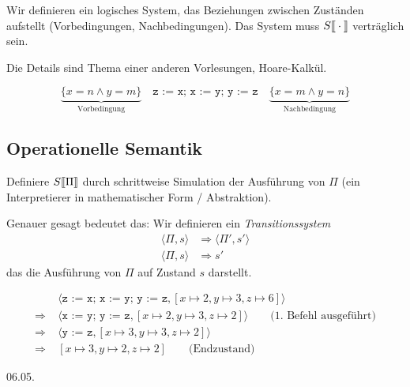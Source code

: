Wir definieren ein logisches System, das Beziehungen zwischen Zuständen aufstellt (Vorbedingungen, Nachbedingungen). Das System muss $S\mathrm{[}\kern-.14em\mathrm{[}\cdot\mathrm{]}\kern-.14em\mathrm{]}$ verträglich sein.

Die Details sind Thema einer anderen Vorlesungen, \zb{} Hoare-Kalkül.

\begin{example}
    \[
    \underbrace{\{ x = n \wedge y = m \}}_{\text{Vorbedingung}} \quad \texttt{z := x; x := y; y := z} \quad \underbrace{\{ x = m \wedge y = n \}}_{\text{Nachbedingung}}
    \]
\end{example}



\subsection{Operationelle Semantik}

Definiere $S\mathrm{[}\kern-.14em\mathrm{[}\Pi\mathrm{]}\kern-.14em\mathrm{]}$ durch schrittweise Simulation der Ausführung von $\Pi$ (ein Interpretierer in mathematischer Form / Abstraktion).

Genauer gesagt bedeutet das: Wir definieren ein \emph{Transitionssystem}
\begin{align*}
    \langle \Pi, s \rangle & \Rightarrow \langle \Pi', s' \rangle \\
    \langle \Pi, s \rangle & \Rightarrow s'
\end{align*}
das die Ausführung von $\Pi$ auf Zustand $s$ darstellt.

\begin{example}
    \begin{align*}
        & \langle \texttt{z := x; x := y; y := z}, [x \mapsto 2, y \mapsto 3, z \mapsto 6] \rangle \\
        \Rightarrow \; & \langle \texttt{x := y; y := z}, [x \mapsto 2, y \mapsto 3, z \mapsto 2] \rangle \quad\quad \text{(1. Befehl ausgeführt)} \\
        \Rightarrow \; & \langle \texttt{y := z}, [x \mapsto 3, y \mapsto 3, z \mapsto 2] \rangle \\
        \Rightarrow \; & [x \mapsto 3, y \mapsto 2, z \mapsto 2] \quad\quad \text{(Endzustand)}
    \end{align*}
\end{example}



\newpage
\hfill 06.05.


